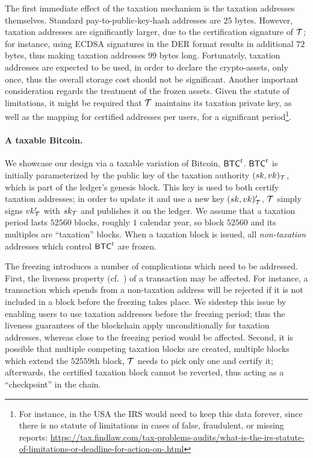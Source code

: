 The first immediate effect of the taxation mechanism is the taxation addresses
themselves. Standard pay-to-public-key-hash
addresses are $25$ bytes.
However, taxation addresses are significantly larger, due to the certification
signature of $\mathcal{T}$; for instance, using ECDSA signatures in the DER format
results in additional $72$ bytes, thus making taxation addresses $99$ bytes
long. Fortunately, taxation addresses are expected to be used, in order to
declare the crypto-assets, only once, thus the overall storage cost should not
be significant.
Another important consideration regards the treatment of the frozen assets.
Given the statute of limitations, it might be required that
$\mathcal{T}$ maintains its taxation private key, as well as the mapping for
certified addresses per users, for a significant period\footnote{For
instance, in the USA the IRS would need to keep this data forever, since there
is no statute of limitations in cases of false, fraudulent, or missing reports:
\url{https://tax.findlaw.com/tax-problems-audits/what-is-the-irs-statute-of-limitations-or-deadline-for-action-on-.html}}.

\paragraph{A taxable Bitcoin.}

We showcase our design via a taxable variation of Bitcoin, $\mathsf{BTC}^{t}$. $\mathsf{BTC}^{t}$
is initially parameterized by the public key of the taxation authority
$(sk, vk)_\mathcal{T}$, which is part of the ledger's genesis block. This key is
used to both certify taxation addresses; in order to update it and use a new
key $(sk, vk)_\mathcal{T}'$, $\mathcal{T}$ simply signs $vk_\mathcal{T}'$ with
$sk_\mathcal{T}$ and publishes it on the ledger.
We assume that a taxation period lasts $52560$ blocks, \ie roughly $1$ calendar
year, so block $52560$ and its multiples are ``taxation'' blocks.  When a
taxation block is issued, all \emph{non-taxation} addresses which control
$\mathsf{BTC}^{t}$ are frozen.

The freezing introduces a number of complications which need to be addressed.
First, the liveness property (cf.~\cite{EC:GarKiaLeo15}) of a transaction may
be affected. For instance, a transaction which spends from a non-taxation
address will be rejected if it is not included in a block before the freezing
takes place. We sidestep this issue by enabling users to use taxation addresses
before the freezing period; thus the liveness guarantees of the blockchain
apply unconditionally for taxation addresses, whereas close to the freezing
period would be affected. Second, it is possible that multiple competing
taxation blocks are created, \eg multiple blocks which extend the $52559$th
block, $\mathcal{T}$ needs to pick only one and certify it; afterwards, the
certified taxation block cannot be reverted, thus acting as a ``checkpoint'' in
the chain.

